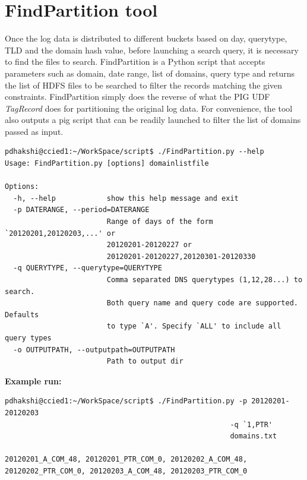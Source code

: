 \documentclass[11pt,a4paper]{article}
\begin{document}
\section{FindPartition tool}
Once the log data is distributed to different buckets based on day, querytype, TLD and the domain hash value, before launching a search query, it is necessary to find the files to search. FindPartition is a Python script that accepts parameters such as domain, date range, list of domains, query type and returns the list of HDFS files to be searched to filter the records matching the given constraints. FindPartition simply does the reverse of what the PIG UDF \textit{TagRecord} does for partitioning the original log data. For convenience, the tool also outputs a pig script that can be readily launched to filter the list of domains passed as input.

\begin{verbatim}
pdhakshi@ccied1:~/WorkSpace/script$ ./FindPartition.py --help
Usage: FindPartition.py [options] domainlistfile

Options:
  -h, --help            show this help message and exit
  -p DATERANGE, --period=DATERANGE
                        Range of days of the form `20120201,20120203,...' or
                        20120201-20120227 or
                        20120201-20120227,20120301-20120330
  -q QUERYTYPE, --querytype=QUERYTYPE
                        Comma separated DNS querytypes (1,12,28...) to search.
                        Both query name and query code are supported. Defaults
                        to type `A'. Specify `ALL' to include all query types
  -o OUTPUTPATH, --outputpath=OUTPUTPATH
                        Path to output dir
\end{verbatim}
\noindent
\textbf{Example run: }
\begin{verbatim}
pdhakshi@ccied1:~/WorkSpace/script$ ./FindPartition.py -p 20120201-20120203
                                                     -q `1,PTR'
                                                     domains.txt 

20120201_A_COM_48, 20120201_PTR_COM_0, 20120202_A_COM_48, 
20120202_PTR_COM_0, 20120203_A_COM_48, 20120203_PTR_COM_0

\end{verbatim}
\end{document}
